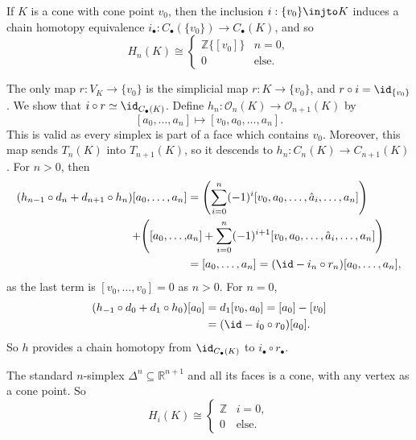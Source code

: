 \documentclass[12pt]{article}
\begin{document}
\begin{proposition}
	If $K$ is a cone with cone point $v_0$, then the inclusion $i : \{v_0\} \injto K$ induces a chain homotopy equivalence $i_\bullet : C_\bullet(\{v_0\}) \to C_\bullet(K)$, and so
	\[
	H_n(K) \cong
	\begin{cases}
		\mathbb{Z}\{[v_0]\} & n = 0, \\
		0 & \text{else}.
	\end{cases}
	\]
\end{proposition}

\begin{proofbox}
	The only map $r : V_K \to \{v_0\}$ is the simplicial map $r : K \to \{v_0\}$, and $r \circ i = \id_{\{v_0\}}$. We show that $i \circ r \simeq \id_{C_\bullet(K)}$. Define $h_n : \mathcal{O}_n(K) \to \mathcal{O}_{n+1}(K)$ by
	\[
		[a_0, \ldots, a_n] \mapsto [v_0, a_0, \ldots, a_n].
	\]
	This is valid as every simplex is part of a face which contains $v_0$. Moreover, this map sends $T_n(K)$ into $T_{n+1}(K)$, so it descends to $h_n : C_n(K) \to C_{n+1}(K)$. For $n > 0$, then
	\begin{align*}
		(h_{n-1} \circ d_n + d_{n+1} \circ h_n)[a_0, \ldots, a_n] &= \Biggl( \sum_{i = 0}^n (-1)^i [v_0, a_0, \ldots, \hat a_i, \ldots, a_n] \Biggr) \\
	+ \Biggl( [a_0, \ldots, & a_n] + \sum_{i = 0}^n (-1)^{i+1}[v_0, a_0, \ldots, \hat a_i, \ldots, a_n ]\Biggr) \\
									  &= [a_0, \ldots, a_n] = (\id - i_n \circ r_n) [a_0, \ldots, a_n],
	\end{align*}
	as the last term is $[v_0, \ldots, v_0] = 0$ as $n > 0$. For $n = 0$,
	\begin{align*}
		(h_{-1} \circ d_0 + d_1 \circ h_0) [a_0] &= d_1 [v_0, a_0] = [a_0] - [v_0] \\
							 &= (\id - i_0 \circ r_0) [a_0].
	\end{align*}
	So $h$ provides a chain homotopy from $\id_{C_\bullet(K)}$ to $i_\bullet \circ r_\bullet$.
\end{proofbox}

\begin{corollary}
	The standard $n$-simplex $\Delta^n \subseteq \mathbb{R}^{n+1}$ and all its faces is a cone, with any vertex as a cone point. So
	\[
	H_i(K) \cong
	\begin{cases}
		\mathbb{Z} & i = 0, \\
		0 & \text{else}.
	\end{cases}
	\]
\end{corollary}
\end{document}
